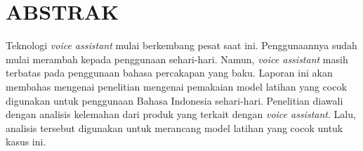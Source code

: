 \clearpage
\chapter*{ABSTRAK}

Teknologi \textit{voice assistant} mulai berkembang pesat saat ini. Penggunaannya sudah mulai merambah kepada penggunaan sehari-hari. Namun, \textit{voice assistant} masih terbatas pada penggunaan bahasa percakapan yang baku. Laporan ini akan membahas mengenai penelitian mengenai pemakaian model latihan yang cocok digunakan untuk penggunaan Bahasa Indonesia sehari-hari. Penelitian diawali dengan analisis kelemahan dari produk yang terkait dengan \textit{voice assistant}. Lalu, analisis tersebut digunakan untuk merancang model latihan yang cocok untuk kasus ini.
\clearpage